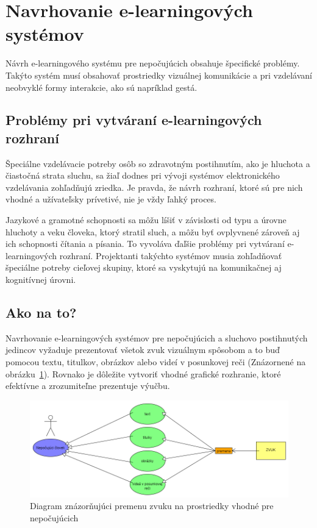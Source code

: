 \documentclass[10pt,oneside,slovak,a4paper]{article}
\begin{document}
\section{Navrhovanie e-learningových systémov} \label{navrhovanie}
Návrh e-learningového systému pre nepočujúcich obsahuje špecifické problémy. Takýto systém musí obsahovať prostriedky vizuálnej komunikácie a pri vzdelávaní neobvyklé formy interakcie, ako sú napríklad gestá.
\subsection{Problémy pri vytváraní e-learningových rozhraní} \label{navrhovanie:problemy}
Špeciálne vzdelávacie potreby osôb so zdravotným postihnutím, ako je hluchota a čiastočná strata sluchu, sa žiaľ dodnes pri vývoji systémov elektronického vzdelávania zohľadňujú zriedka. Je pravda, že návrh rozhraní, ktoré sú pre nich vhodné a užívateľsky prívetivé, nie je vždy ľahký proces.

Jazykové a gramotné schopnosti sa môžu líšiť v závislosti od typu a úrovne hluchoty a veku človeka, ktorý stratil sluch, a môžu byť ovplyvnené zároveň aj ich schopnosti čítania a písania. To vyvoláva ďaľšie problémy pri vytváraní e-learningových rozhraní. Projektanti takýchto systémov musia zohľadňovať špeciálne potreby cieľovej skupiny, ktoré sa vyskytujú na komunikačnej aj kognitívnej úrovni.\cite{pappas2018learning}

\subsection{Ako na to?}\label{navrhovanie:ako}
Navrhovanie e-learningových systémov pre nepočujúcich a sluchovo postihnutých jedincov vyžaduje prezentovať všetok zvuk vizuálnym spôsobom a to buď pomocou textu, titulkov, obrázkov alebo videí v posunkovej reči (Znázornené na obrázku~\ref{diagram}). Rovnako je dôležite vytvoriť vhodné grafické rozhranie, ktoré efektívne a zrozumiteľne prezentuje výučbu.
\begin{figure}[H]
   \includegraphics[scale=0.4]{diagram.png}
\centering
\caption{Diagram znázorňujúci premenu zvuku na prostriedky vhodné pre nepočujúcich}

\label{diagram}
\end{figure}
\end{document}
